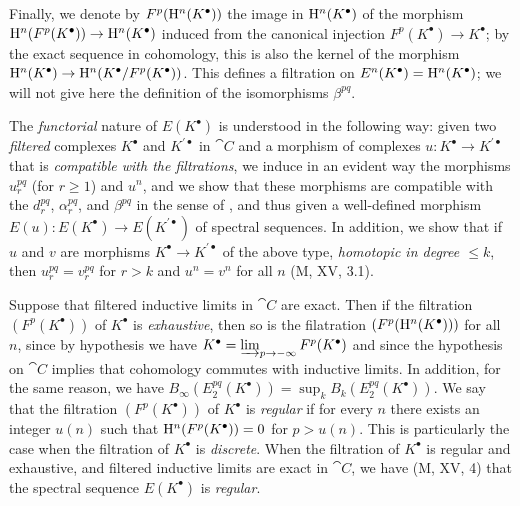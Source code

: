 \begin{env}[11.2.2]
Finally, we denote by $F^p(\mathrm{H}^n(K^\bullet))$ the image in $\mathrm{H}^n(K^\bullet)$ of the morphism $\HH^n(F^p(K^\bullet))\to\HH^n(K^\bullet)$ induced from the canonical injection $F^p(K^\bullet)\to K^\bullet$; by the exact sequence in cohomology, this is also the kernel of the morphism $\HH^n(K^\bullet)\to\HH^n(K^\bullet/F^p(K^\bullet))$.
This defines a filtration on $E^n(K^\bullet)=\mathrm{H}^n(K^\bullet)$; we will not give here the definition of the isomorphisms $\beta^{pq}$.
\end{env}

\begin{env}[11.2.3]
\label{0.11.2.3}
The \emph{functorial} nature of $E(K^\bullet)$ is understood in the following way: given two \emph{filtered} complexes $K^\bullet$ and $K^{\prime\bullet}$ in $\cat{C}$ and a morphism of complexes $u:K^\bullet\to K^{\prime\bullet}$ that is \emph{compatible with the filtrations}, we induce in an evident way the morphisms $u_r^{pq}$ (for $r\geq 1$) and $u^n$, and we show that these morphisms are compatible with the $d_r^{pq}$, $\alpha_r^{pq}$, and $\beta^{pq}$ in the sense of , and thus given a well-defined morphism $E(u):E(K^\bullet)\to E(K^{\prime\bullet})$ of spectral sequences.
In addition, we show that if $u$ and $v$ are morphisms $K^\bullet\to K^{\prime\bullet}$ of the above type, \emph{homotopic in degree $\leq k$}, then $u_r^{pq}=v_r^{pq}$ for $r>k$ and $u^n=v^n$ for all $n$ (M, XV, 3.1).
\end{env}

\begin{env}[11.2.4]
\label{0.11.2.4}
Suppose that filtered inductive limits in $\cat{C}$ are exact.
Then if the filtration $(F^p(K^\bullet))$ of $K^\bullet$ is \emph{exhaustive}, then so is the filatration $(F^p(\mathrm{H}^n(K^\bullet)))$ for all $n$, since by hypothesis we have $K^\bullet=\varinjlim_{p\to-\infty}F^p(K^\bullet)$ and since the hypothesis on $\cat{C}$ implies that cohomology commutes with inductive limits.
In addition, for the same reason, we have $B_\infty(E_2^{pq}(K^\bullet))=\sup_k B_k(E_2^{pq}(K^\bullet))$.
We say that the filtration $(F^p(K^\bullet))$ of $K^\bullet$ is \emph{regular} if for every $n$ there exists an integer $u(n)$ such that $\mathrm{H}^n(F^p(K^\bullet))=0$ for $p>u(n)$.
This is particularly the case when the filtration of $K^\bullet$ is \emph{discrete}.
When the filtration of $K^\bullet$ is regular and exhaustive, and filtered inductive limits are exact in $\cat{C}$, we have (M, XV, 4) that the spectral sequence $E(K^\bullet)$ is \emph{regular}.
\end{env}

